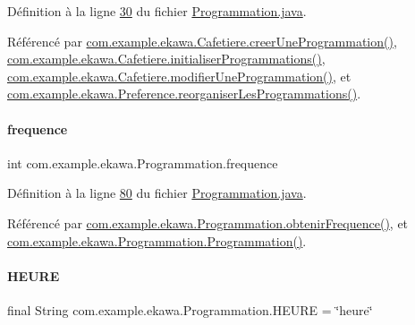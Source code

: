 Définition à la ligne \hyperlink{_programmation_8java_source_l00030}{30} du fichier \hyperlink{_programmation_8java_source}{Programmation.\+java}.



Référencé par \hyperlink{_cafetiere_8java_source_l00731}{com.\+example.\+ekawa.\+Cafetiere.\+creer\+Une\+Programmation()}, \hyperlink{_cafetiere_8java_source_l00692}{com.\+example.\+ekawa.\+Cafetiere.\+initialiser\+Programmations()}, \hyperlink{_cafetiere_8java_source_l00775}{com.\+example.\+ekawa.\+Cafetiere.\+modifier\+Une\+Programmation()}, et \hyperlink{_preference_8java_source_l00157}{com.\+example.\+ekawa.\+Preference.\+reorganiser\+Les\+Programmations()}.

\mbox{\label{classcom_1_1example_1_1ekawa_1_1_programmation_a6d0fd682b51727025ed8c4bf35fc8980}} 
\paragraph{\texorpdfstring{frequence}{frequence}}
{\footnotesize\ttfamily int com.\+example.\+ekawa.\+Programmation.\+frequence\hspace{0.3cm}{\ttfamily [private]}}



Définition à la ligne \hyperlink{_programmation_8java_source_l00080}{80} du fichier \hyperlink{_programmation_8java_source}{Programmation.\+java}.



Référencé par \hyperlink{_programmation_8java_source_l00160}{com.\+example.\+ekawa.\+Programmation.\+obtenir\+Frequence()}, et \hyperlink{_programmation_8java_source_l00091}{com.\+example.\+ekawa.\+Programmation.\+Programmation()}.

\mbox{\label{classcom_1_1example_1_1ekawa_1_1_programmation_aafa433ee13f4473d27cd7db34bbc4584}} 
\paragraph{\texorpdfstring{H\+E\+U\+RE}{HEURE}}
{\footnotesize\ttfamily final String com.\+example.\+ekawa.\+Programmation.\+H\+E\+U\+RE = \char`\"{}heure\char`\"{}\hspace{0.3cm}{\ttfamily [static]}}



